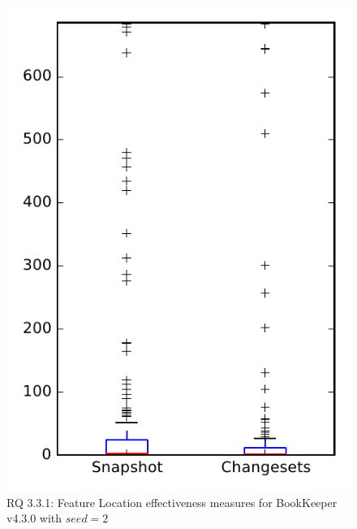 
\begin{figure}
\centering
\includegraphics[height=0.4\textheight]{figures/flt_seed/rq1_bookkeeper_2}
\caption{RQ 3.3.1: Feature Location effectiveness measures for BookKeeper v4.3.0 with $seed=2$}
\label{fig:flt_seed:rq1:bookkeeper}
\end{figure}
